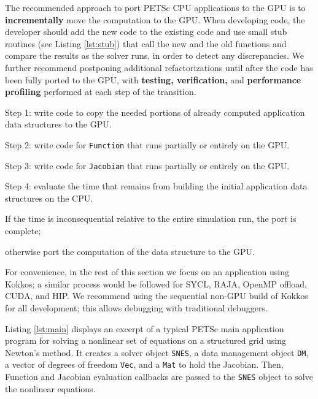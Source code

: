 \documentclass[10pt,journal,compsoc]{IEEEtran}
\newenvironment{titemize} %
        {\begin{list}{\labelitemi}{
                \setlength{\topsep}{0pt}
                \setlength{\parskip}{0pt}
                \setlength{\itemsep}{0pt}
                \setlength{\parsep}{0pt}
                \setlength{\leftmargin}{23pt}
                \setlength{\labelwidth}{23pt}
        }}
        {\end{list}}
\begin{document}
The recommended approach to port PETSc CPU applications to the GPU is to {\bf incrementally} move the computation to the GPU.
When developing code, the developer should add the new code to the existing code and use small stub routines (see Listing \ref{lst:stub})
that call  the new and the old functions and compare the results as the solver runs, in order to detect any
discrepancies.
We further recommend postponing additional refactorizations until after the code has been fully ported to the GPU,
with {\bf testing, verification,} and {\bf performance profiling} performed at each
step of the transition.
\begin{titemize}
   \item Step 1: write code to copy the needed portions of already computed application data structures to the GPU.
   \item Step 2: write code for {\tt  Function} that runs partially or entirely on the GPU.
   \item Step 3: write code for {\tt  Jacobian} that runs partially or entirely on the GPU.
   \item Step 4: evaluate the time that remains from building the initial application data structures on the CPU.
   \begin{titemize}
        \item If the time is inconsequential relative to the entire simulation run, the port is complete;
        \item otherwise port the computation of the data structure to the GPU.
    \end{titemize}
 \end{titemize}
For convenience, in the rest of this section we focus on an application
using Kokkos; a similar process would be followed for SYCL, RAJA, OpenMP offload,
CUDA, and HIP.  We recommend using the sequential
non-GPU build of Kokkos for all development; this allows debugging with
traditional debuggers. 

Listing \ref{lst:main} displays an excerpt of a typical PETSc main application program
for solving a nonlinear set of equations on a structured grid using Newton's method.
It creates a solver object {\tt SNES}, a data management object {\tt DM}, a vector of degrees of freedom {\tt Vec}, and a {\tt Mat} to hold the Jacobian.
Then, Function and Jacobian evaluation callbacks are passed to the {\tt SNES} object to solve the nonlinear equations.
\end{document}
